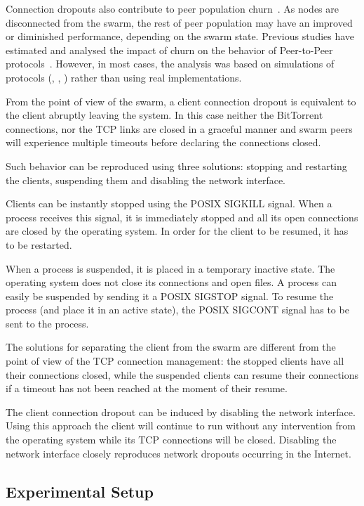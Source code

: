 Connection dropouts also contribute to peer population
churn~\cite{understanding-churn}. As nodes are disconnected from the swarm, the
rest of peer population may have an improved or diminished performance,
depending on the swarm state. Previous studies have estimated and analysed the
impact of churn on the behavior of Peer-to-Peer
protocols~\cite{Binzenhofer:2007:ECS:1769187.1769257}. However, in most cases,
the analysis was based on simulations of protocols (\cite{Luo2010},
\cite{Katsaros2009}, \cite{Ou:2010:PEK:1749614.1749649}) rather than using
real implementations.

From the point of view of the swarm, a client connection dropout is equivalent
to the client abruptly leaving the system. In this case neither the
BitTorrent connections, nor the TCP links are closed in a graceful manner and
swarm peers will experience multiple timeouts before declaring the connections
closed.

Such behavior can be reproduced using three solutions: stopping and restarting
the clients, suspending them and disabling the network interface.

Clients can be instantly stopped using the POSIX SIGKILL signal. When a
process receives this signal, it is immediately stopped and all its open
connections are closed by the operating system. In order for the client to be
resumed, it has to be restarted.

When a process is suspended, it is placed in a temporary inactive state. The
operating system does not close its connections and open files. A process
can easily be suspended by sending it a POSIX SIGSTOP signal. To resume the
process (and place it in an active state), the POSIX SIGCONT signal has to be
sent to the process.

The solutions for separating the client from the swarm are different from the
point of view of the TCP connection management: the stopped clients have all
their connections closed, while the suspended clients can resume their
connections if a timeout has not been reached at the moment of their resume.

The client connection dropout can be induced by disabling the network
interface. Using this approach the client will continue to run without any
intervention from the operating system while its TCP connections will be
closed. Disabling the network interface closely reproduces network dropouts
occurring in the Internet.

\subsection{Experimental Setup}
\label{subsec:virt-infra:dropouts-setup}


